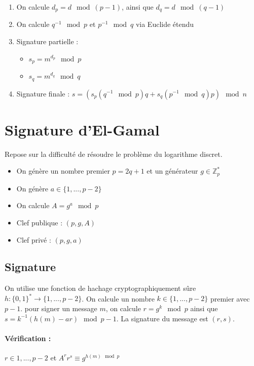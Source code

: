\documentclass[11pt,a4paper]{report}
\begin{document}
\begin{enumerate}
    \item On calcule $d_p=d\mod (p-1)$, ainsi que $d_q=d\mod (q-1)$
    \item On calcule $q^{-1}\mod p$ et $p^{-1}\mod q$ via Euclide étendu
    \item Signature partielle :
    \begin{itemize}
        \item $s_p = m^{d_p} \mod p$
        \item $s_q = m^{d_q} \mod q$
    \end{itemize}
    \item Signature finale : $s=(s_p(q^{-1} \mod p)q+s_q(p^{-1} \mod q)p) \mod n$
    \end{enumerate}

\section{Signature d'El-Gamal}

Repose sur la difficulté de résoudre le problème du logarithme discret.

\begin{itemize}
    \item On génère un nombre premier $p=2q+1$ et un générateur $g\in \mathbb{Z}^*_p$
    \item On génère $a \in \{1,...,p-2\}$
    \item On calcule $A=g^a\mod p$
    \item Clef publique : $(p,g,A)$
    \item Clef privé : $(p,g,a)$
\end{itemize}

\subsection{Signature}

On utilise une fonction de hachage cryptographiquement sûre $h:\{0,1\}^* \longrightarrow \{1,...,p-2\}$. On calcule un nombre $k\in\{1,...,p-2\}$ premier avec $p-1$. pour signer un message $m$, on calcule $r=g^k\mod p$ ainsi que $s=k^{-1}(h(m)-ar)\mod p-1$. La signature du message est $(r,s)$.

\paragraph*{Vérification : } $r\in{1,...,p-2}$ et $A^rr^s\equiv g^{h(m) \mod p}$
\end{document}
